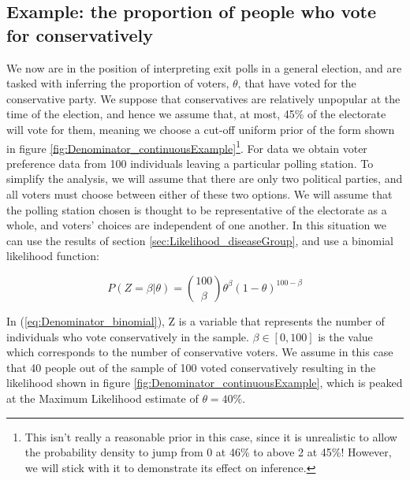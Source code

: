 \documentclass[11pt,fullpage]{book}
\begin{document}
\subsection{Example: the proportion of people who vote for conservatively}\label{sec:Denominator_continuousExample}
We now are in the position of interpreting exit polls in a general election, and are tasked with inferring the proportion of voters, $\theta$, that have voted for the conservative party. We suppose that conservatives are relatively unpopular at the time of the election, and hence we assume that, at most, 45\% of the electorate will vote for them, meaning we choose a cut-off uniform prior of the form shown in figure \ref{fig:Denominator_continuousExample}\footnote{This isn't really a reasonable prior in this case, since it is unrealistic to allow the probability density to jump from 0 at 46\% to above 2 at 45\%! However, we will stick with it to demonstrate its effect on inference.}. For data we obtain voter preference data from 100 individuals leaving a particular polling station. To simplify the analysis, we will assume that there are only two political parties, and all voters must choose between either of these two options. We will assume that the polling station chosen is thought to be representative of the electorate as a whole, and voters' choices are independent of one another. In this situation we can use the results of section \ref{sec:Likelihood_diseaseGroup}, and use a binomial likelihood function:

\begin{equation}\label{eq:Denominator_binomial}
P(Z=\beta|\theta) = {100 \choose \beta} \theta^\beta (1-\theta)^{100-\beta}
\end{equation}

In (\ref{eq:Denominator_binomial}), Z is a variable that represents the number of individuals who vote conservatively in the sample. $\beta\in[0,100]$ is the value which corresponds to the number of conservative voters. We assume in this case that 40 people out of the sample of 100 voted conservatively resulting in the likelihood shown in figure \ref{fig:Denominator_continuousExample}, which is peaked at the Maximum Likelihood estimate of $\theta=40\%$.
\end{document}
